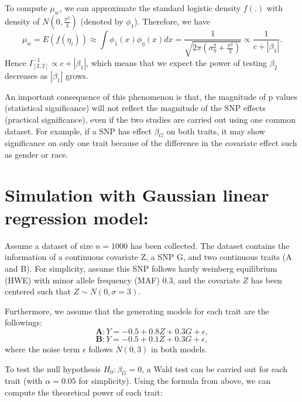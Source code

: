 \documentclass[
]{article}
\begin{document}
To compute \(\mu_w\), we can approximate the standard logistic density
\(f(.)\) with density of \(N(0,\frac{\pi^2}{3})\) (denoted by
\(\phi_1\)). Therefore, we have
\[\mu_w = E(f(\eta_i)) \approx \int\phi_1(x)\phi_{\eta}(x)dx = \frac{1}{\sqrt{2\pi(\sigma_\eta^2+\frac{\pi^2}{3})}} \propto \frac{1}{c+|\beta_1|}.\]
Hence \(I^{-1}_{[2,2]} \propto c+|\beta_1|\), which means that we expect
the power of testing \(\beta_2\) decreases as \(|\beta_1|\) grows.

An important consequence of this phenomenon is that, the magnitude of p
values (statistical significance) will not reflect the magnitude of the
SNP effects (practical significance), even if the two studies are
carried out using one common dataset. For example, if a SNP has effect
\(\beta_G\) on both traits, it may show significance on only one trait
because of the difference in the covariate effect such as gender or
race.

\hypertarget{simulation-with-gaussian-linear-regression-model}{%
\section{Simulation with Gaussian linear regression
model:}\label{simulation-with-gaussian-linear-regression-model}}

Assume a dataset of size \(n=1000\) has been collected. The dataset
contains the information of a continuous covariate Z, a SNP G, and two
continuous traits (A and B). For simplicity, assume this SNP follows
hardy weinberg equilibrium (HWE) with minor allele frequency (MAF)
\(0.3\), and the covariate \(Z\) has been centered such that
\(Z\sim N(0,\sigma=3)\).

Furthermore, we assume that the generating models for each trait are the
followings: \[\textbf{A}:Y = -0.5 + 0.8Z + 0.3G + \epsilon,\]
\[\textbf{B}: Y = -0.5 + 0.1Z + 0.3G + \epsilon,\] where the noise term
\(\epsilon\) follows \(N(0,3)\) in both models.

To test the null hypothesis \(H_0: \beta_G = 0\), a Wald test can be
carried out for each trait (with \(\alpha=0.05\) for simplicity). Using
the formula from above, we can compute the theoretical power of each
trait:
\end{document}
